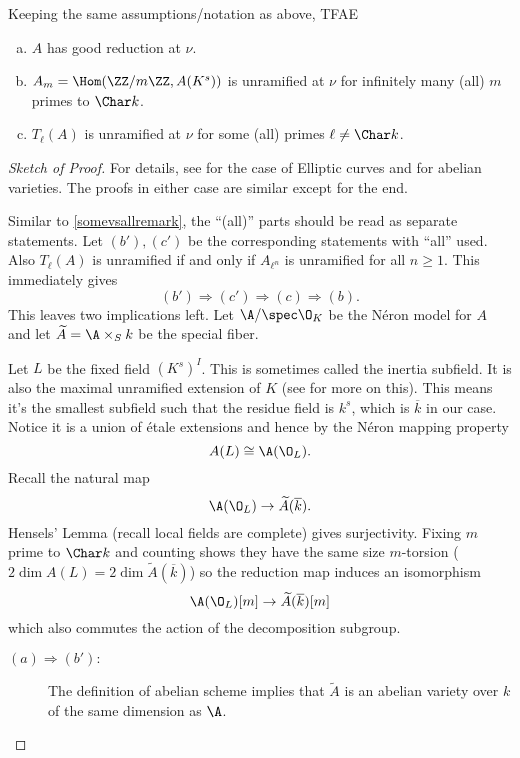 \documentclass[11pt]{article}
\newcommand{\neron}{N\'{e}ron }
\newcommand{\etale}{\'{e}tale }
\begin{document}
\begin{thm}\label{NOScriterionforav}
	Keeping the same assumptions/notation as above, TFAE
	\begin{enumerate}[(a)]
		\item $A$ has good reduction at $\nu$.
		\item $A_m = \Hom(\ZZ/m\ZZ,A(K^s))$ is unramified at $\nu$ for infinitely many (all) $m$ primes to $\Char k$.
		\item $T_\ell(A)$ is unramified at $\nu$ for some (all) primes $\ell\neq\Char k$.
	\end{enumerate}
\end{thm}
\begin{proof}[Sketch of Proof]
	For details, see {\cite[Thm.~VII.7.1]{silverman2009arithmetic}} for the case of Elliptic curves and {\cite[Thm.~1]{serre1968good}} for abelian varieties. The proofs in either case are similar except for the end.

	Similar to \autoref{somevsallremark}, the ``(all)'' parts should be read as separate statements. Let $(b'),(c')$ be the corresponding statements with ``all'' used. Also $T_\ell(A)$ is unramified if and only if $A_{\ell^n}$ is unramified for all $n\geq 1$. This immediately gives
	$$
		(b') \Rightarrow (c')\Rightarrow (c) \Rightarrow (b).
	$$
	This leaves two implications left. Let $\A/\spec\O_K$ be the \neron model for $A$ and let $\widetilde{A} = \A\times_S k$ be the special fiber.
	
	Let $L$ be the fixed field $(K^s)^I$. This is sometimes called the inertia subfield. It is also the maximal unramified extension of $K$ (see \cite[Ch.~2.8,9]{neukirch2013algebraic} for more on this). This means it's the smallest subfield such that the residue field is $k^s$, which is $\overline{k}$ in our case. Notice it is a union of \etale extensions and hence by the \neron mapping property
	$$
		A(L) \cong \A(\O_L).
	$$
	Recall the natural map
	$$
		\A(\O_{L}) \to \widetilde{A}(\overline{k}).
	$$
	Hensels' Lemma (recall local fields are complete) gives surjectivity. Fixing $m$ prime to $\Char k$ and counting shows they have the same size $m$-torsion ($2\dim A(L) = 2\dim \widetilde{A}(\overline{k})$) so the reduction map induces an isomorphism
	$$
		\A(\O_L)[m] \to \widetilde{A}(\overline{k})[m]
	$$
	which also commutes the action of the decomposition subgroup. 
	\begin{description}
		\item[$(a) \Rightarrow (b'):$]
			The definition of abelian scheme implies that $\widetilde{A}$ is an abelian variety over $k$ of the same dimension as $\A$.
			

\end{description}
\end{proof}
\end{document}
